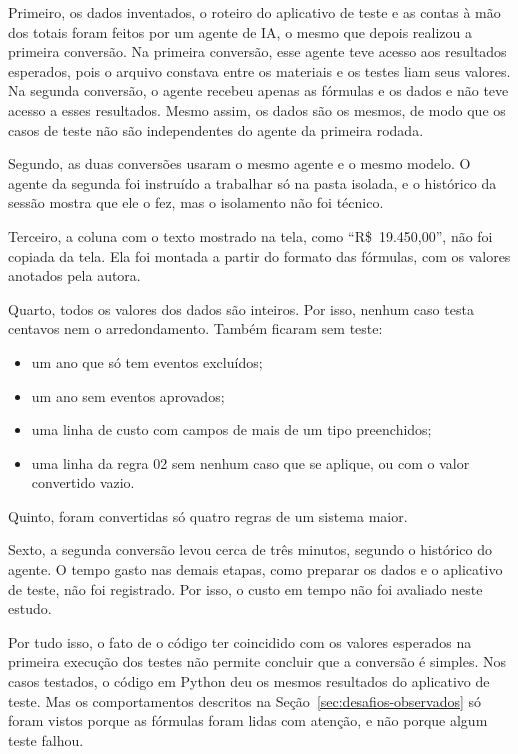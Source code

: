Primeiro, os dados inventados, o roteiro do aplicativo de teste e as contas à mão dos totais foram feitos por um agente de IA, o mesmo que depois realizou a primeira conversão. Na primeira conversão, esse agente teve acesso aos resultados esperados, pois o arquivo constava entre os materiais e os testes liam seus valores. Na segunda conversão, o agente recebeu apenas as fórmulas e os dados e não teve acesso a esses resultados. Mesmo assim, os dados são os mesmos, de modo que os casos de teste não são independentes do agente da primeira rodada.

Segundo, as duas conversões usaram o mesmo agente e o mesmo modelo. O agente da segunda foi instruído a trabalhar só na pasta isolada, e o histórico da sessão mostra que ele o fez, mas o isolamento não foi técnico.

Terceiro, a coluna com o texto mostrado na tela, como ``R\$~19.450,00'', não foi copiada da tela. Ela foi montada a partir do formato das fórmulas, com os valores anotados pela autora.

Quarto, todos os valores dos dados são inteiros. Por isso, nenhum caso testa centavos nem o arredondamento. Também ficaram sem teste:

\begin{itemize}
    \item um ano que só tem eventos excluídos;
    \item um ano sem eventos aprovados;
    \item uma linha de custo com campos de mais de um tipo preenchidos;
    \item uma linha da regra 02 sem nenhum caso que se aplique, ou com o valor convertido vazio.
\end{itemize}

Quinto, foram convertidas só quatro regras de um sistema maior.

Sexto, a segunda conversão levou cerca de três minutos, segundo o histórico do agente. O tempo gasto nas demais etapas, como preparar os dados e o aplicativo de teste, não foi registrado. Por isso, o custo em tempo não foi avaliado neste estudo.

Por tudo isso, o fato de o código ter coincidido com os valores esperados na primeira execução dos testes não permite concluir que a conversão é simples. Nos casos testados, o código em Python deu os mesmos resultados do aplicativo de teste. Mas os comportamentos descritos na Seção~\ref{sec:desafios-observados} só foram vistos porque as fórmulas foram lidas com atenção, e não porque algum teste falhou.

